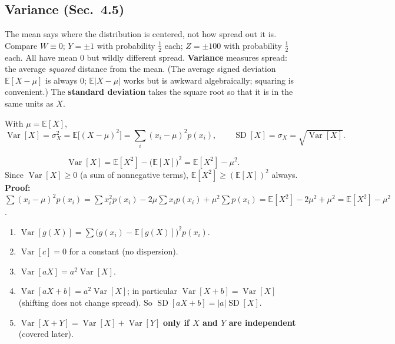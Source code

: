 \documentclass[11pt]{article}
\let\oldsubsection\subsection
\renewcommand{\subsection}{\Needspace{14\baselineskip}\oldsubsection}
\newcommand{\E}{\mathbb{E}}
\newcommand{\Var}{\operatorname{Var}}
\newcommand{\SD}{\operatorname{SD}}
\begin{document}
\subsection{Variance (Sec.\ 4.5)}

\begin{ideabox}
The mean says where the distribution is centered, not how spread out it is. Compare $W\equiv0$; $Y=\pm1$ with probability $\tfrac12$ each; $Z=\pm100$ with probability $\tfrac12$ each. All have mean 0 but wildly different spread. \textbf{Variance} measures spread: the average \emph{squared} distance from the mean. (The average signed deviation $\E[X-\mu]$ is always 0; $\E|X-\mu|$ works but is awkward algebraically; squaring is convenient.) The \textbf{standard deviation} takes the square root so that it is in the same units as $X$.
\end{ideabox}

\begin{defbox}
With $\mu=\E[X]$,
\[ \Var[X]=\sigma_X^2=\E\big[(X-\mu)^2\big]=\sum_i(x_i-\mu)^2p(x_i),\qquad \SD[X]=\sigma_X=\sqrt{\Var[X]}. \]
\end{defbox}

\begin{thmbox}
\[ \Var[X]=\E[X^2]-\big(\E[X]\big)^2=\E[X^2]-\mu^2. \]
Since $\Var[X]\ge0$ (a sum of nonnegative terms), $\E[X^2]\ge(\E[X])^2$ always.\\
\textbf{Proof:} $\sum(x_i-\mu)^2p(x_i)=\sum x_i^2p(x_i)-2\mu\sum x_ip(x_i)+\mu^2\sum p(x_i)=\E[X^2]-2\mu^2+\mu^2=\E[X^2]-\mu^2$.
\end{thmbox}

\begin{thmbox}
\begin{enumerate}
\item $\Var[g(X)]=\sum\big(g(x_i)-\E[g(X)]\big)^2p(x_i)$.
\item $\Var[c]=0$ for a constant (no dispersion).
\item $\Var[aX]=a^2\Var[X]$.
\item $\Var[aX+b]=a^2\Var[X]$; in particular $\Var[X+b]=\Var[X]$ (shifting does not change spread). So $\SD[aX+b]=|a|\SD[X]$.
\item $\Var[X+Y]=\Var[X]+\Var[Y]$ \textbf{only if $X$ and $Y$ are independent} (covered later).
\end{enumerate}
\end{thmbox}
\end{document}
